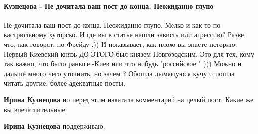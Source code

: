  
 
 
 
 
\paragraph{Кузнецова - Не дочитала ваш пост до конца. Неожиданно глупо}

\begin{itemize}
 

Не дочитала ваш пост до конца. Неожиданно глупо. Мелко и как-то по-кастрюльному
хуторско. И где вы в статье нашли зависть или агрессию? Разве что, как говорят,
по Фрейду .)) И показывает, как плохо вы знаете историю. Первый Киевский князь
ДО ЭТОГО был князем Новгородским. Это для тех, кому так важно, что было раньше
-Киев или что нибудь "российское " ))) Можно и дальше много чего уточнить, но
зачем ? Обошла дымящуюся кучу и пошла читать другие, более адекватные посты.

\begin{itemize}

 
\textbf{Ирина Кузнецова} но перед этим накатала комментарий на целый пост. Какие же вы впечатлительные.

 
\textbf{Ирина Кузнецова} поддерживаю.

 

\end{itemize}
\end{itemize}
